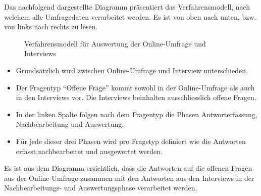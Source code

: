 \documentclass[../../main.tex]{subfiles}
\begin{document}
\begin{sloppypar}
Das nachfolgend dargestellte Diagramm präsentiert das Verfahrensmodell, nach welchem alle Umfragedaten verarbeitet werden. Es ist von oben nach unten, bzw. von links nach rechts zu lesen.
\end{sloppypar}

\begin{figure}[H]
 \centering
    
 \caption{Verfahrensmodell für Auswertung der Online-Umfrage und Interviews}
 \label{Allgemeines Vorgehen}
\end{figure}

\begin{sloppypar}
\begin{itemize}
  \item Grundsätzlich wird zwischen Online-Umfrage und Interview unterschieden. 
  \item Der Fragentyp "`Offene Frage"' kommt sowohl in der Online-Umfrage \newline als auch in den Interviews vor. Die Interviews beinhalten ausschliesslich offene Fragen.
  \item In der linken Spalte folgen nach dem Fragentyp die Phasen Antworterfassung, \newline Nachbearbeitung und Auswertung. 
  \item Für jede dieser drei Phasen wird pro Fragetyp definiert wie die Antworten erfasst,\newline nachbearbeitet und ausgewertet werden.
\end{itemize}

Es ist aus dem Diagramm ersichtlich, dass die Antworten auf die offenen Fragen aus der Online-Umfrage zusammen mit den Antworten aus den Interviews in der Nachbearbeitungs- und Auswertungsphase verarbeitet werden.
\end{sloppypar}
\end{document}

